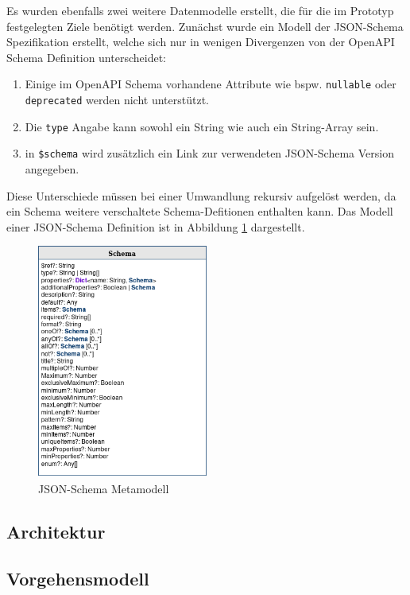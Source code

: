 Es wurden ebenfalls zwei weitere Datenmodelle erstellt, die für die im Prototyp festgelegten Ziele benötigt werden. Zunächst wurde ein Modell der JSON-Schema Spezifikation erstellt, welche sich nur in wenigen Divergenzen von der OpenAPI Schema Definition unterscheidet:

\begin{enumerate}
	\item Einige im OpenAPI Schema vorhandene Attribute wie bspw. \lstinline|nullable| oder \lstinline|deprecated| werden nicht unterstützt.
	\item Die \lstinline|type| Angabe kann sowohl ein String wie auch ein String-Array sein.
	\item in \lstinline|$schema| wird zusätzlich ein Link zur verwendeten JSON-Schema Version angegeben. 
\end{enumerate}

Diese Unterschiede müssen bei einer Umwandlung rekursiv aufgelöst werden, da ein Schema weitere verschaltete Schema-Defitionen enthalten kann. Das Modell einer JSON-Schema Definition ist in Abbildung \ref{fig:jsonschema} dargestellt.

\begin{figure}
\centering
  \includegraphics[width=0.5\textwidth]{../images/json-schema.png}
  \caption{JSON-Schema Metamodell}
  \label{fig:jsonschema}
\end{figure}


\subsection{Architektur}


\subsection{Vorgehensmodell}
